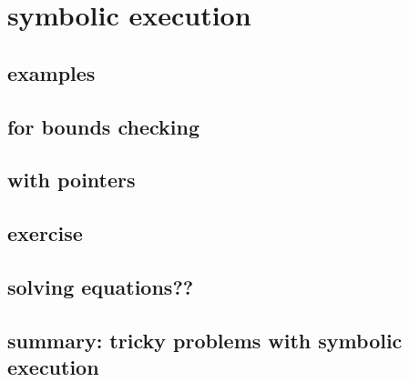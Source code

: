 \section{symbolic execution}



\subsection{examples}





        

\subsection{for bounds checking}


\subsection{with pointers}


\subsection{exercise}


\subsection{solving equations??}

\subsection{summary: tricky problems with symbolic execution}


